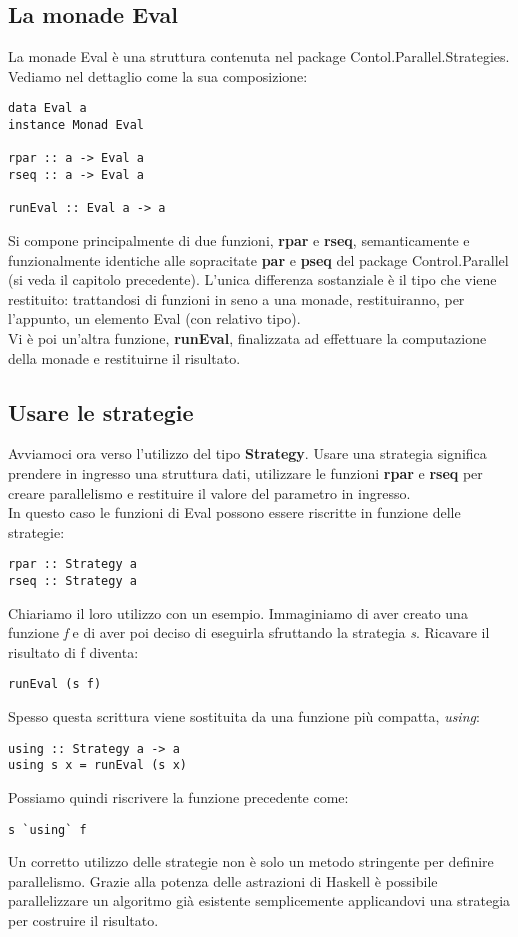 \subsection{La monade Eval}
La monade Eval è una struttura contenuta nel package Contol.Parallel.Strategies. Vediamo nel dettaglio come la sua composizione:
\begin{verbatim}
data Eval a
instance Monad Eval

rpar :: a -> Eval a
rseq :: a -> Eval a

runEval :: Eval a -> a
\end{verbatim}
Si compone principalmente di due funzioni, \textbf{rpar} e \textbf{rseq}, semanticamente e funzionalmente identiche alle sopracitate \textbf{par} e \textbf{pseq} del package Control.Parallel (si veda il capitolo precedente). L'unica differenza sostanziale è il tipo che viene restituito: trattandosi di funzioni in seno a una monade, restituiranno, per l'appunto, un elemento Eval (con relativo tipo).\\
Vi è poi un'altra funzione, \textbf{runEval}, finalizzata ad effettuare la computazione della monade e restituirne il risultato.\\
\subsection{Usare le strategie}
Avviamoci ora verso l'utilizzo del tipo \textbf{Strategy}. Usare una strategia significa prendere in ingresso una struttura dati, utilizzare le funzioni \textbf{rpar} e \textbf{rseq} per creare parallelismo e restituire il valore del parametro in ingresso.\\
In questo caso le funzioni di Eval possono essere riscritte in funzione delle strategie:
\begin{verbatim}
rpar :: Strategy a
rseq :: Strategy a
\end{verbatim}
Chiariamo il loro utilizzo con un esempio. Immaginiamo di aver creato una funzione \textit{f} e di aver poi deciso di eseguirla sfruttando la strategia \textit{s}. Ricavare il risultato di f diventa:
\begin{verbatim}
runEval (s f)
\end{verbatim}
Spesso questa scrittura viene sostituita da una funzione più compatta, \textit{using}:
\begin{verbatim}
using :: Strategy a -> a
using s x = runEval (s x)
\end{verbatim}
Possiamo quindi riscrivere la funzione precedente come:
\begin{verbatim}
s `using` f
\end{verbatim}
Un corretto utilizzo delle strategie non è solo un metodo stringente per definire parallelismo. Grazie alla potenza delle astrazioni di Haskell è possibile parallelizzare un algoritmo già esistente semplicemente applicandovi una strategia per costruire il risultato.\\
